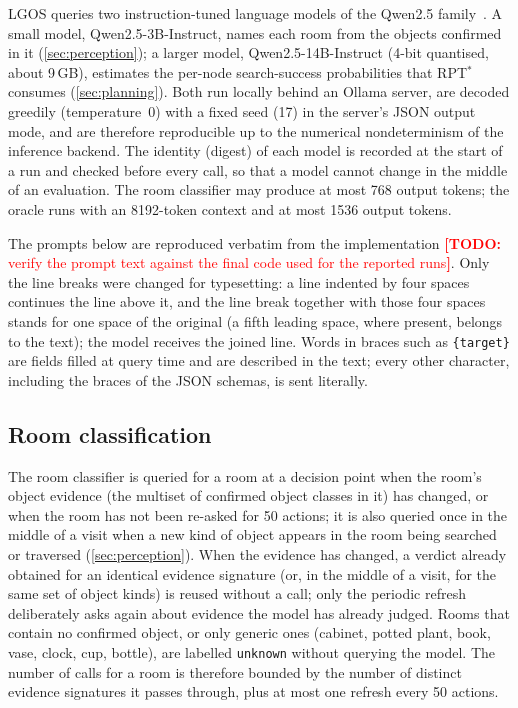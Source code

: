 \documentclass[10pt]{article}
\newcommand{\TODO}[1]{\textcolor{red}{\textbf{[TODO:} #1\textbf{]}}}
\newcommand{\ours}{LGOS\xspace}
\begin{document}
\ours queries two instruction-tuned language models of the Qwen2.5 family~\citep{yang2024qwen25}. A small model, Qwen2.5-3B-Instruct, names each room from the objects confirmed in it (\cref{sec:perception}); a larger model, Qwen2.5-14B-Instruct (4-bit quantised, about 9\,GB), estimates the per-node search-success probabilities that RPT$^*$ consumes (\cref{sec:planning}). Both run locally behind an Ollama server, are decoded greedily (temperature~0) with a fixed seed (17) in the server's JSON output mode, and are therefore reproducible up to the numerical nondeterminism of the inference backend. The identity (digest) of each model is recorded at the start of a run and checked before every call, so that a model cannot change in the middle of an evaluation. The room classifier may produce at most 768 output tokens; the oracle runs with an 8192-token context and at most 1536 output tokens.

The prompts below are reproduced verbatim from the implementation \TODO{verify the prompt text against the final code used for the reported runs}. Only the line breaks were changed for typesetting: a line indented by four spaces continues the line above it, and the line break together with those four spaces stands for one space of the original (a fifth leading space, where present, belongs to the text); the model receives the joined line. Words in braces such as \texttt{\{target\}} are fields filled at query time and are described in the text; every other character, including the braces of the JSON schemas, is sent literally.

\subsection{Room classification}\label{app:prompts-room}

The room classifier is queried for a room at a decision point when the room's object evidence (the multiset of confirmed object classes in it) has changed, or when the room has not been re-asked for 50 actions; it is also queried once in the middle of a visit when a new kind of object appears in the room being searched or traversed (\cref{sec:perception}). When the evidence has changed, a verdict already obtained for an identical evidence signature (or, in the middle of a visit, for the same set of object kinds) is reused without a call; only the periodic refresh deliberately asks again about evidence the model has already judged. Rooms that contain no confirmed object, or only generic ones (cabinet, potted plant, book, vase, clock, cup, bottle), are labelled \texttt{unknown} without querying the model. The number of calls for a room is therefore bounded by the number of distinct evidence signatures it passes through, plus at most one refresh every 50 actions.
\end{document}
